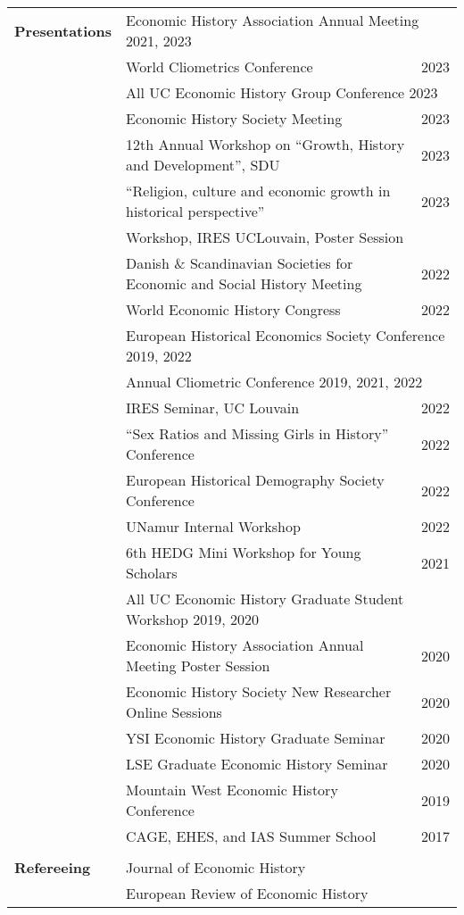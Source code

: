 \documentclass[a4paper,11pt,oneside]{article}
\begin{document}
\begin{longtable}{@{} p{0.175\linewidth} p{0.775\linewidth} p{0.05\linewidth}}
   
   
   
   \textbf{\large{Presentations}} 
   & \multicolumn{2}{l}{ Economic History Association Annual Meeting   \hfill 2021, 2023}\\
   & World Cliometrics Conference &  \hfill 2023  \\
   & \multicolumn{2}{l}{ All UC Economic History Group Conference  \hfill 2023}\\
   &  Economic History Society Meeting & \hfill 2023\\
   & 12th Annual Workshop on ``Growth, History and Development'', SDU &  \hfill 2023\\
   & ``Religion, culture and economic growth in historical perspective'' &  \hfill 2023 \\ 
   & \hspace{4ex} Workshop, IRES UCLouvain, Poster Session \\
   & Danish  \& Scandinavian Societies for Economic and Social History Meeting &  \hfill 2022  \\
   & World Economic History Congress & \hfill 2022 \\
   & \multicolumn{2}{l}{  European Historical Economics Society Conference   \hfill 2019, 2022} \\
   & \multicolumn{2}{l}{ Annual Cliometric Conference    \hfill 2019, 2021, 2022} \\
   & IRES Seminar, UC Louvain & \hfill 2022 \\
   &  ``Sex Ratios and Missing Girls in History'' Conference & \hfill 2022\\
   & European Historical Demography Society Conference & \hfill 2022 \\
   & UNamur Internal Workshop & \hfill 2022 \\
   &   6th HEDG Mini Workshop for Young Scholars   & \hfill 2021\\
   & \multicolumn{2}{l}{ All UC Economic History Graduate Student Workshop  \hfill 2019, 2020}\\
   &  Economic History Association Annual Meeting Poster Session & \hfill  2020\\
   &  Economic History Society New Researcher Online Sessions & \hfill 2020\\
   &  YSI Economic History Graduate Seminar & \hfill 2020\\
   &  LSE Graduate Economic History Seminar & \hfill  2020\\
   &  Mountain West Economic History Conference  & \hfill  2019\\
   &  CAGE, EHES, and IAS Summer School  & \hfill  2017\\
   \\
   \textbf{\large{Refereeing}}   &   Journal of Economic History&\\
   &   European Review of Economic History &\\
\end{longtable}
\end{document}
